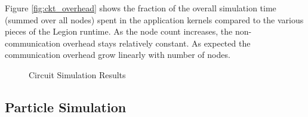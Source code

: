 Figure \ref{fig:ckt_overhead} shows the fraction of the overall simulation time (summed over
all nodes) spent in the application kernels compared to the various pieces of the Legion
runtime.  As the node count increases, the non-communication overhead stays relatively constant.
As expected the communication overhead grow linearly with number of nodes.

\begin{figure}

\caption{Circuit Simulation Results}
\end{figure}

\subsection{Particle Simulation}
\label{subsec:exp_fluid}

